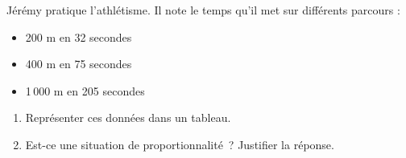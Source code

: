 \documentclass[exercice]{thedocument}%
\begin{document}
%
Jérémy pratique l'athlétisme. Il note le temps qu'il met sur différents parcours :
\begin{itemize}
    \item 200 m en 32 secondes
    \item 400 m en 75 secondes
    \item 1\,000 m en 205 secondes
\end{itemize}
\begin{enumerate}
    \item Représenter ces données dans un tableau.
    \item Est-ce une situation de proportionnalité~? Justifier la réponse.
\end{enumerate}
\end{document}
